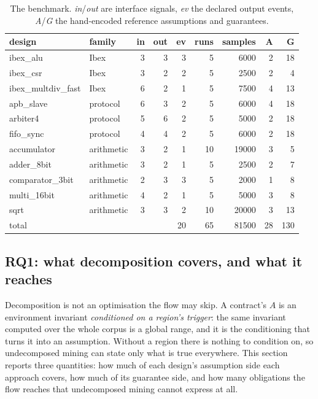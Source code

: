 \begin{table}[t]
\centering
\caption{The benchmark. \emph{in}/\emph{out} are interface signals, \emph{ev} the declared
output events, \emph{A}/\emph{G} the hand-encoded reference assumptions and guarantees.}
\label{tab:setup}
\begin{tabular}{llrrrrrrr}
\toprule
design & family & in & out & ev & runs & samples & A & G \\
\midrule
ibex\_alu & Ibex & 3 & 3 & 3 & 5 & 6000 & 2 & 18 \\
ibex\_csr & Ibex & 3 & 2 & 2 & 5 & 2500 & 2 & 4 \\
ibex\_multdiv\_fast & Ibex & 6 & 2 & 1 & 5 & 7500 & 4 & 13 \\
apb\_slave & protocol & 6 & 3 & 2 & 5 & 6000 & 4 & 18 \\
arbiter4 & protocol & 5 & 6 & 2 & 5 & 5000 & 2 & 18 \\
fifo\_sync & protocol & 4 & 4 & 2 & 5 & 6000 & 2 & 18 \\
accumulator & arithmetic & 3 & 2 & 1 & 10 & 19000 & 3 & 5 \\
adder\_8bit & arithmetic & 3 & 2 & 1 & 5 & 2500 & 2 & 7 \\
comparator\_3bit & arithmetic & 2 & 3 & 3 & 5 & 2000 & 1 & 8 \\
multi\_16bit & arithmetic & 4 & 2 & 1 & 5 & 5000 & 3 & 8 \\
sqrt & arithmetic & 3 & 3 & 2 & 10 & 20000 & 3 & 13 \\
\midrule
total & & & & 20 & 65 & 81500 & 28 & 130 \\
\bottomrule
\end{tabular}
\end{table}

\subsection{RQ1: what decomposition covers, and what it reaches}
\label{sec:rq1}
Decomposition is not an optimisation the flow may skip. A contract's $A$ is an environment
invariant \emph{conditioned on a region's trigger}: the same invariant computed over the whole
corpus is a global range, and it is the conditioning that turns it into an assumption. Without
a region there is nothing to condition on, so undecomposed mining can state only what is true
everywhere. This section reports three quantities: how much of each design's assumption side
each approach covers, how much of its guarantee side, and how many obligations the flow
reaches that undecomposed mining cannot express at all.

